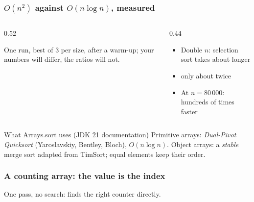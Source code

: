 \documentclass[aspectratio=169,10pt,compress]{beamer}
\begin{document}
\begin{frame}[t,fragile] \frametitle{$O(n^{2})$ against $O(n \log n)$, measured}
	\begin{columns}[T]
		\begin{column}{0.52\textwidth}

			\footnotesize One run, best of 3 per size, after a warm-up;
			your numbers will differ, the ratios will not.
		\end{column}
		\begin{column}{0.44\textwidth}
			\begin{itemize}\small
				\item Double $n$: selection sort takes about  longer
				\item {} only about twice
				\item At $n = 80\,000$: hundreds of times faster
			\end{itemize}
		\end{column}
	\end{columns}

	\vspace{0.5em}
	\begin{block}{What Arrays.sort uses (JDK 21 documentation)}
		\small Primitive arrays: \emph{Dual-Pivot Quicksort} (Yaroslavskiy, Bentley, Bloch), $O(n \log n)$.
		Object arrays: a \emph{stable} merge sort adapted from TimSort; equal elements keep their order.
	\end{block}
\end{frame}








\begin{frame}[t,fragile] \frametitle{A counting array: the value is the index}

	\small One pass, no search:  finds the right counter directly.
\end{frame}
\end{document}
